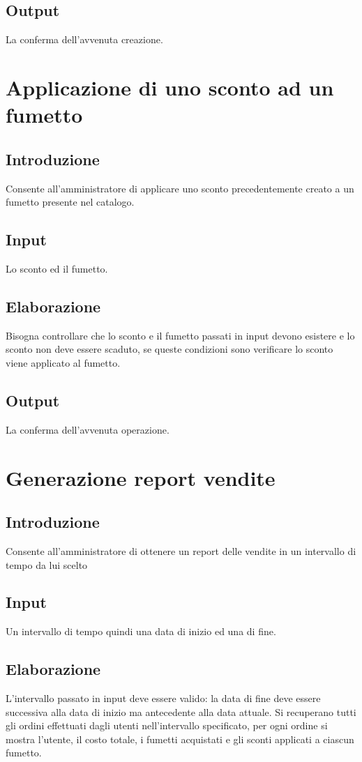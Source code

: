 \documentclass{scrreprt}
\begin{document}
\subsection*{Output}
La conferma dell'avvenuta creazione.

\section{Applicazione di uno sconto ad un fumetto}

\subsection*{Introduzione}
Consente all'amministratore di applicare uno sconto precedentemente creato a un fumetto presente nel catalogo.
\subsection*{Input}
Lo sconto ed il fumetto.
\subsection*{Elaborazione}
Bisogna controllare che lo sconto e il fumetto passati in input devono esistere e lo sconto non deve essere scaduto,
se queste condizioni sono verificare lo sconto viene applicato al fumetto.
\subsection*{Output}
La conferma dell'avvenuta operazione.

\section{Generazione report vendite}

\subsection*{Introduzione}
Consente all'amministratore di ottenere un report delle vendite in un intervallo di tempo da lui scelto
\subsection*{Input}
Un intervallo di tempo quindi una data di inizio ed una di fine.
\subsection*{Elaborazione}
L'intervallo passato in input deve essere valido: la data di fine deve essere successiva alla data di inizio ma
antecedente alla data attuale.
Si recuperano tutti gli ordini effettuati dagli utenti nell'intervallo specificato, per ogni ordine si mostra l'utente,
il costo totale, i fumetti acquistati e gli sconti applicati a ciascun fumetto.
\end{document}
